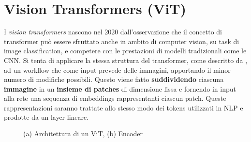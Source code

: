\section{Vision Transformers (ViT)}
\label{vit}
I \textit{vision transformers} \cite{vit} nascono nel 2020 dall'osservazione che il concetto di transformer può essere sfruttato anche in ambito di computer vision, su task di image classification, e competere con le prestazioni di modelli tradizionali come le CNN. Si tenta di applicare la stessa struttura del transformer, come descritto da \cite{transformer}, ad un workflow che come input prevede delle immagini, apportando il minor numero di modifiche possibili. Questo viene fatto \textbf{suddividendo} ciascuna \textbf{immagine} in un \textbf{insieme di patches} di dimensione fissa e fornendo in input alla rete una sequenza di embeddings rappresentanti ciascun patch. Queste rappresentazioni saranno trattate allo stesso modo dei tokens utilizzati in NLP e prodotte da un layer lineare.

\begin{figure}[ht]
    \centering
    \caption{(a) Architettura di un ViT, (b) Encoder}
    \label{fig:arch_vit}
\end{figure}

